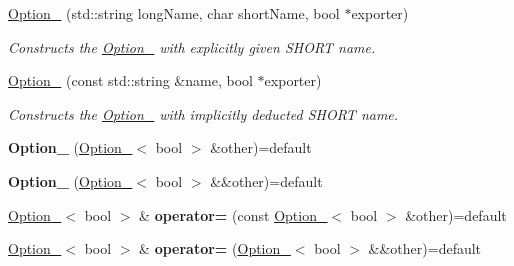 \begin{DoxyCompactItemize}
    \item
    \mbox{\hyperlink{class_info_parse_1_1_option___3_01bool_01_4_add1541692551d1529d8b6f3c9b7791c1}{Option\+\_\+}} (std\+::string long\+Name, char short\+Name, bool $\ast$exporter)
    \begin{DoxyCompactList}
        \small\item\em Constructs the \mbox{\hyperlink{class_info_parse_1_1_option__}{Option\+\_\+}} with explicitly given S\+H\+O\+RT name.
    \end{DoxyCompactList}\item
    \mbox{\hyperlink{class_info_parse_1_1_option___3_01bool_01_4_ad0dff23b27a73b2db3b6fcd4dcc8a306}{Option\+\_\+}} (const std\+::string \&name, bool $\ast$exporter)
    \begin{DoxyCompactList}
        \small\item\em Constructs the \mbox{\hyperlink{class_info_parse_1_1_option__}{Option\+\_\+}} with implicitly deducted S\+H\+O\+RT name.
    \end{DoxyCompactList}\item
    \mbox{\label{class_info_parse_1_1_option___3_01bool_01_4_a5384d94f3a87a8bdd35ba532df2f81b2}}
    {\bfseries Option\+\_\+} (\mbox{\hyperlink{class_info_parse_1_1_option__}{Option\+\_\+}}$<$ bool $>$ \&other)=default
    \item
    \mbox{\label{class_info_parse_1_1_option___3_01bool_01_4_a4ad554e3da6eff4362b92ff7f5a5607a}}
    {\bfseries Option\+\_\+} (\mbox{\hyperlink{class_info_parse_1_1_option__}{Option\+\_\+}}$<$ bool $>$ \&\&other)=default
    \item
    \mbox{\label{class_info_parse_1_1_option___3_01bool_01_4_a06d8ac918fd405cc7eac7db1bc54bc19}}
    \mbox{\hyperlink{class_info_parse_1_1_option__}{Option\+\_\+}}$<$ bool $>$ \& {\bfseries operator=} (const \mbox{\hyperlink{class_info_parse_1_1_option__}{Option\+\_\+}}$<$ bool $>$ \&other)=default
    \item
    \mbox{\label{class_info_parse_1_1_option___3_01bool_01_4_ad59fac5a4987f905aa0b96413caf6fa8}}
    \mbox{\hyperlink{class_info_parse_1_1_option__}{Option\+\_\+}}$<$ bool $>$ \& {\bfseries operator=} (\mbox{\hyperlink{class_info_parse_1_1_option__}{Option\+\_\+}}$<$ bool $>$ \&\&other)=default

\end{DoxyCompactItemize}
